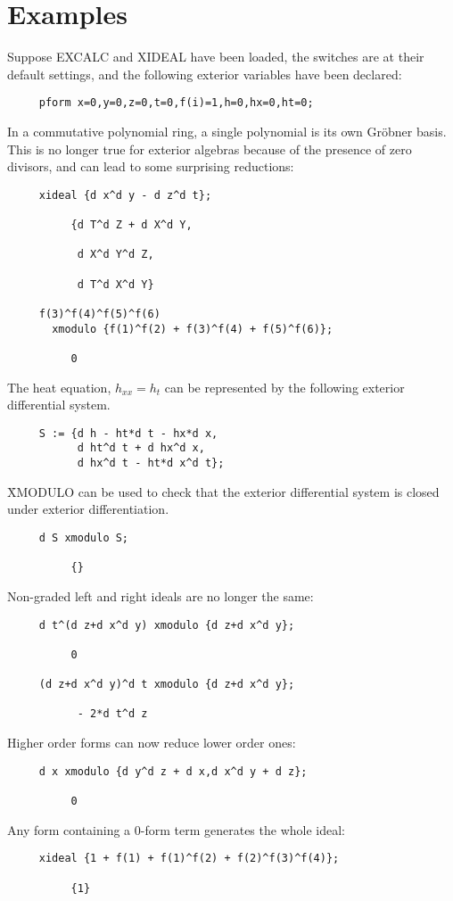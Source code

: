 \documentclass[11pt,letterpaper]{book}
\begin{document}
\section{Examples}

Suppose EXCALC and XIDEAL have been loaded, the switches are at their
default settings, and the following exterior variables have been declared:

{\small\begin{verbatim}
     pform x=0,y=0,z=0,t=0,f(i)=1,h=0,hx=0,ht=0;
\end{verbatim}}

In a commutative polynomial ring, a single polynomial is its own Gr\"obner
basis.  This is no longer true for exterior algebras because of the presence
of zero divisors, and can lead to some surprising reductions:
{\small\begin{verbatim}
     xideal {d x^d y - d z^d t};

          {d T^d Z + d X^d Y,

           d X^d Y^d Z,

           d T^d X^d Y}

     f(3)^f(4)^f(5)^f(6)
       xmodulo {f(1)^f(2) + f(3)^f(4) + f(5)^f(6)};

          0
\end{verbatim}}

The heat equation, $h_{xx}=h_t$ can be represented by the following
exterior differential system.
{\small\begin{verbatim}
     S := {d h - ht*d t - hx*d x,
           d ht^d t + d hx^d x,
           d hx^d t - ht*d x^d t};
\end{verbatim}}
\f{XMODULO} can be used to check that the exterior differential system is
closed under exterior differentiation.
{\small\begin{verbatim}
     d S xmodulo S;

          {}
\end{verbatim}}

Non-graded left and right ideals are no longer the same:
{\small\begin{verbatim}
     d t^(d z+d x^d y) xmodulo {d z+d x^d y};

          0

     (d z+d x^d y)^d t xmodulo {d z+d x^d y};

           - 2*d t^d z
\end{verbatim}}
Higher order forms can now reduce lower order ones:
{\small\begin{verbatim}
     d x xmodulo {d y^d z + d x,d x^d y + d z};

          0
\end{verbatim}}
Any form containing a 0-form term generates the whole ideal:
{\small\begin{verbatim}
     xideal {1 + f(1) + f(1)^f(2) + f(2)^f(3)^f(4)};

          {1}
\end{verbatim}}
\end{document}
